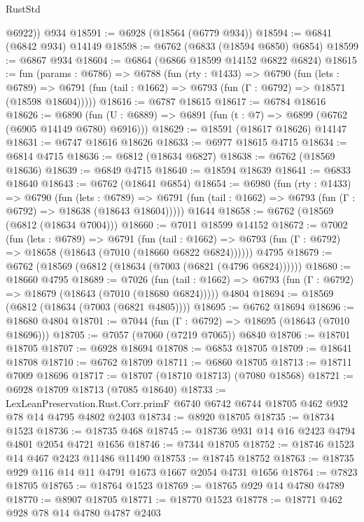 \begin{lexlean}{RustStd}
\begin{coremodule}
        @6922))
    @934
@18591 := @6928 (@18564 (@6779 @934))
@18594 := @6841 (@6842 @934) @14149
@18598 := @6762 (@6833 (@18594 @6850) @6854)
@18599 := @6867 @934
@18604 := @6864 (@6866 @18599 @14152 @6822 @6824)
@18615 := fun (params : @6786) =>
  @6788
    (fun (rty : @1433) =>
    @6790
      (fun (lets : @6789) =>
      @6791 (fun (tail : @1662) => @6793 (fun (Γ : @6792) => @18571 (@18598 @18604)))))
@18616 := @6787 @18615
@18617 := @6784 @18616
@18626 := @6890
    (fun (U : @6889) => @6891 (fun (t : @7) => @6899 (@6762 (@6905 @14149 @6780) @6916)))
@18629 := @18591 (@18617 @18626) @14147
@18631 := @6747 @18616 @18626
@18633 := @6977 @18615 @4715
@18634 := @6814 @4715
@18636 := @6812 (@18634 @6827)
@18638 := @6762 (@18569 @18636)
@18639 := @6849 @4715
@18640 := @18594 @18639
@18641 := @6833 @18640
@18643 := @6762 (@18641 @6854)
@18654 := @6980
    (fun (rty : @1433) =>
    @6790
      (fun (lets : @6789) =>
      @6791 (fun (tail : @1662) => @6793 (fun (Γ : @6792) => @18638 (@18643 @18604)))))
    @1644
@18658 := @6762 (@18569 (@6812 (@18634 @7004)))
@18660 := @7011 @18599 @14152
@18672 := @7002
    (fun (lets : @6789) =>
    @6791
      (fun (tail : @1662) =>
      @6793 (fun (Γ : @6792) => @18658 (@18643 (@7010 (@18660 @6822 @6824))))))
    @4795
@18679 := @6762 (@18569 (@6812 (@18634 (@7003 (@6821 (@4796 @6824))))))
@18680 := @18660 @4795
@18689 := @7026
    (fun (tail : @1662) => @6793 (fun (Γ : @6792) => @18679 (@18643 (@7010 (@18680 @6824)))))
    @4804
@18694 := @18569 (@6812 (@18634 (@7003 (@6821 @4805))))
@18695 := @6762 @18694
@18696 := @18680 @4804
@18701 := @7044 (fun (Γ : @6792) => @18695 (@18643 (@7010 @18696)))
@18705 := @7057 (@7060 (@7219 @7065)) @6840
@18706 := @18701 @18705
@18707 := @6928 @18694
@18708 := @6853 @18705
@18709 := @18641 @18708
@18710 := @6762 @18709
@18711 := @6860 @18705
@18713 := @18711 @7009 @18696
@18717 := @18707 (@18710 @18713) (@7080 @18568)
@18721 := @6928 @18709 @18713 (@7085 @18640)
@18733 := LexLeanPreservation.Rust.Corr.primF
    @6740
    @6742
    @6744
    @18705
    @462
    @932
    @78
    @14
    @4795
    @4802
    @2403
@18734 := @8920 @18705
@18735 := @18734 @1523
@18736 := @18735 @468
@18745 := @18736 @931 @14 @16 @2423 @4794 @4801 @2054 @4721 @1656
@18746 := @7344 @18705
@18752 := @18746 @1523 @14 @467 @2423 @11486 @11490
@18753 := @18745 @18752
@18763 := @18735 @929 @116 @14 @11 @4791 @1673 @1667 @2054 @4731 @1656
@18764 := @7823 @18705
@18765 := @18764 @1523
@18769 := @18765 @929 @14 @4780 @4789
@18770 := @8907 @18705
@18771 := @18770 @1523
@18778 := @18771 @462 @928 @78 @14 @4780 @4787 @2403

\end{coremodule}
\end{lexlean}

